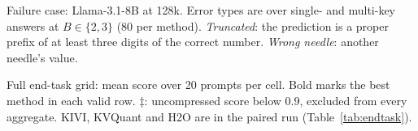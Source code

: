 \begin{table}[h]
\centering
\scriptsize
\setlength{\tabcolsep}{3pt}
\caption{Failure case: Llama-3.1-8B at 128k.  Error types are over single- and multi-key answers at $B\in\{2,3\}$ (80 per method).  \emph{Truncated}: the prediction is a proper prefix of at least three digits of the correct number.  \emph{Wrong needle}: another needle's value.}
\label{tab:app-fail}

\end{table}

\begin{table}[h]
\centering
\scriptsize
\setlength{\tabcolsep}{2.4pt}
\caption{Full end-task grid: mean score over 20 prompts per cell.  Bold marks the best method in each valid row.  $\ddagger$: uncompressed score below 0.9, excluded from every aggregate.  
KIVI, KVQuant and H2O are in the paired run (Table~\ref{tab:endtask}).
}
\label{tab:app-grid}

\end{table}


